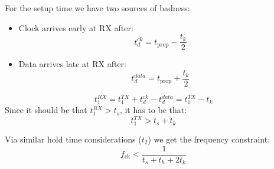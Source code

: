 \documentclass[a4paper,11pt]{article}
\begin{document}
\begin{itemize}
	      For the setup time we have two sources of badness:
	      \begin{itemize}
		      \item Clock arrives early at RX after:
		            $$
			            t_d^{ck} = t_\text{prop} - \frac{t_k}{2}
		            $$
		      \item Data arrives late at RX after:
		            $$
			            t_d^{data} = t_\text{prop} + \frac{t_k}{2}
		            $$
	      \end{itemize}

	      $$t_1^{RX} = t_1^{TX} + t_d^{ck} - t_d^{data} = t_1^{TX} - t_k$$
	      Since it should be that $t_1^{RX} > t_s$, it has to be that:
	      $$
		      t_1^{TX} > t_s + t_k
	      $$

	      Via similar hold time considerations ($t_2$) we get the frequency constraint:
	      $$
		      f_\text{ck} < \frac{1}{t_s + t_h + 2 t_k}
	      $$

\end{itemize}
\end{document}
